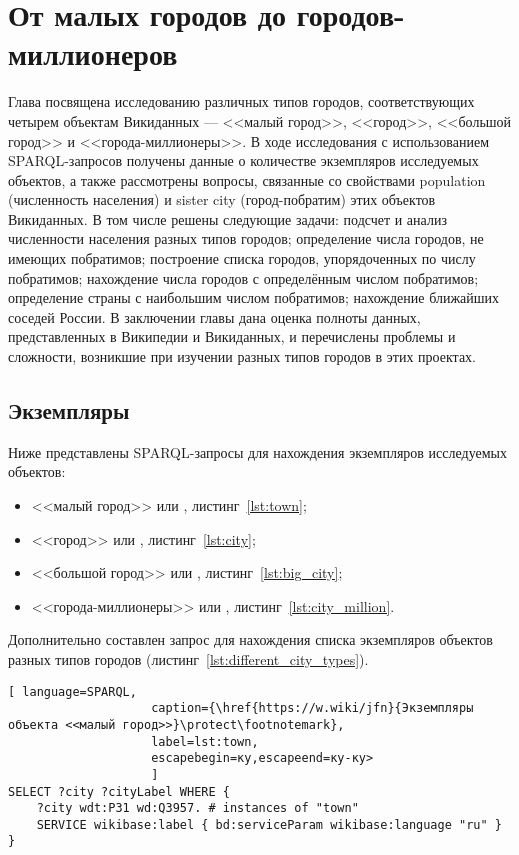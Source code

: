 \chapter{От малых городов до городов-миллионеров}
\label{ch:city}

Глава посвящена исследованию различных типов городов, соответствующих четырем объектам Викиданных — <<малый город>>, <<город>>, <<большой город>> и <<города-миллионеры>>. В ходе исследования с использованием SPARQL-запросов получены данные о количестве экземпляров исследуемых объектов, а также рассмотрены вопросы, связанные со свойствами population (численность населения) и sister city (город-побратим) этих объектов Викиданных. В том числе решены следующие задачи: подсчет и анализ численности населения разных типов городов; определение числа городов, не имеющих побратимов; построение списка городов, упорядоченных по числу побратимов; нахождение числа городов с определённым числом побратимов; определение страны с наибольшим числом побратимов; нахождение ближайших соседей России. В заключении главы дана оценка полноты данных, представленных в Википедии и Викиданных, и перечислены проблемы и сложности, возникшие при изучении разных типов городов в этих проектах.
\section{Экземпляры}

Ниже представлены SPARQL-запросы для нахождения экземпляров исследуемых объектов: 
\begin{itemize}
	\item <<малый город>> или , листинг~\ref{lst:town};
	\item <<город>> или , листинг~\ref{lst:city};
	\item <<большой город>> или , листинг~\ref{lst:big_city};
	\item <<города-миллионеры>> или , листинг~\ref{lst:city_million}.
\end{itemize}

Дополнительно составлен запрос для нахождения списка экземпляров объектов разных типов городов (листинг~\ref{lst:different_city_types}).

\begin{lstlisting}[ language=SPARQL, 
                    caption={\href{https://w.wiki/jfn}{Экземпляры объекта <<малый город>>}\protect\footnotemark},
                    label=lst:town, 
                    escapebegin=ку,escapeend=ку-ку>
                    ]
SELECT ?city ?cityLabel WHERE {
	?city wdt:P31 wd:Q3957. # instances of "town"
	SERVICE wikibase:label { bd:serviceParam wikibase:language "ru" }
}
\end{lstlisting}

